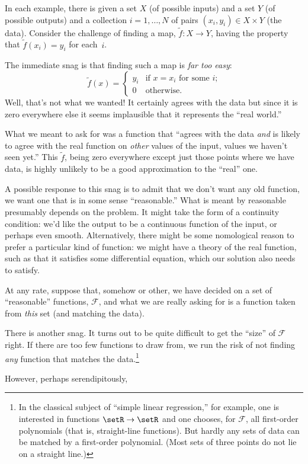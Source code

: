 \documentclass[11pt, a4paper]{article}
\begin{document}
In each example, there is given a set $X$ (of possible inputs) and a
set $Y$ (of possible outputs) and a collection $i=1,\dots,N$ of pairs
$(x_i, y_i)\in X\times Y$ (the data). Consider the challenge of finding a
map, $\tilde{f}\colon X\to Y$, having the property that $\tilde{f}(x_i)=
y_i$ for each~$i$.

The immediate snag is that finding such a map is \emph{far too easy}:
\begin{equation*}
  \tilde{f}(x) =
  \begin{cases}
    y_i & \text{if $x = x_i$ for some $i$;} \\
      0 & \text{otherwise}.
  \end{cases}
\end{equation*}
Well, that's not what we wanted! It certainly agrees with the data but
since it is zero everywhere else it seems implausible that it
represents the “real world.”

What we meant to ask for was a function that “agrees with the data
\emph{and} is likely to agree with the real function on \emph{other}
values of the input, values we haven't seen yet.” This $\tilde{f}$,
being zero everywhere except just those points where we have data, is
highly unlikely to be a good approximation to the “real” one.

A possible response to this snag is to admit that we don't want any
old function, we want one that is in some sense “reasonable.” What is
meant by reasonable presumably depends on the problem. It might take
the form of a continuity condition: we'd like the output to be a
continuous function of the input, or perhaps even
smooth. Alternatively, there might be some nomological reason to
prefer a particular kind of function: we might have a theory of the
real function, such as that it satisfies some differential equation,
which our solution also needs to satisfy.

At any rate, suppose that, somehow or other, we have decided on a set
of “reasonable” functions, $\mathcal{F}$, and what we are really asking for is a
function taken from \emph{this} set (and matching the data).

There is another snag. It turns out to be quite difficult to get the
“size” of $\mathcal{F}$ right. If there are too few functions to draw from, we
run the risk of not finding \emph{any} function that matches the
data.\footnote{In the classical subject of “simple linear regression,” for
example, one is interested in functions $\setR \to \setR$ and one
chooses, for $\mathcal{F}$, all first-order polynomials (that is, straight-line
functions). But hardly any sets of data can be matched by a
first-order polynomial. (Most sets of three points do not lie on a
straight line.)}

However, perhaps serendipitously, 
\end{document}
